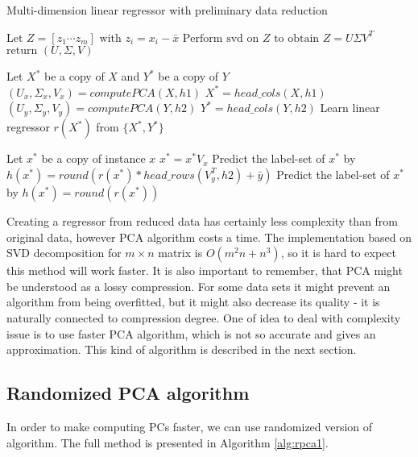 \begin{algorithm}
    \caption{Multi-dimension linear regressor with preliminary data reduction}\label{alg:pca1}
    \begin{algorithmic}[1]
        \State $\text{Let } Z=[z_1 \cdots z_m] \text{ with } z_i = x_i-\bar{x}$
        \State $\text{Perform svd on } Z \text{ to obtain } Z = U\Sigma{V^T}$
        \State $\text{return } (U,\Sigma,V)$
    \EndFunction
    \item[] 
    \State Let $X^{*}$ be a copy of $X$ and $Y^{*}$ be a copy of $Y$
        \State $(U_x, \Sigma_{x}, V_x) = computePCA(X,h1)$
        \State $X^{*}=head\_cols(X, h1)$
    \EndIf
        \State $(U_y, \Sigma_{y}, V_y) = computePCA(Y,h2)$
        \State $Y^{*}=head\_cols(Y, h2)$
    \EndIf
    \State Learn linear regressor $r(X^*)$ from $\{X^*,Y^*\}$
    \item[]
    \State Let $x^*$ be a copy of instance $x$
        \State $x^* = x^*V_x$
    \EndIf
        \State Predict the label-set of $x^*$ by $h(x^*)=round( r(x^*) * head\_rows(V_y^T, h2) + \bar{y})$ 
    \Else
        \State Predict the label-set of $x^*$ by $h(x^*)=round( r(x^*) )$ 
    \EndIf

    \end{algorithmic}
\end{algorithm}

Creating a regressor from reduced data has certainly less complexity than from original data, however PCA algorithm costs a time. The implementation based on SVD decomposition for $m\times{n}$ matrix is $O(m^2n + n^3)$, so it is hard to expect this method will work faster. It is also important to remember, that PCA might be understood as a lossy compression. For some data sets it might prevent an algorithm from being overfitted, but it might also decrease its quality - it is naturally connected to compression degree. 
One of idea to deal with complexity issue is to use faster PCA algorithm, which is not so accurate and gives an approximation. This kind of algorithm is described in the next section.     

\subsection{Randomized PCA algorithm}

In order to make computing PCs faster, we can use randomized version of algorithm. The full method is presented in Algorithm \ref{alg:rpca1}. 

